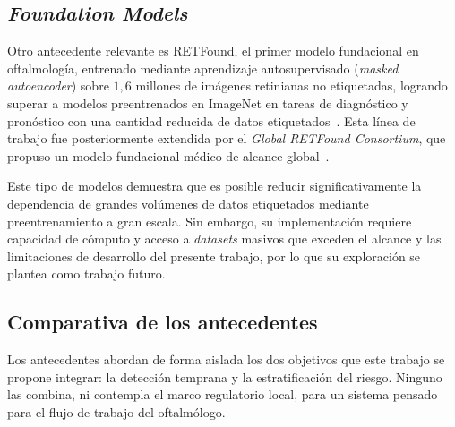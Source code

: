     \subsection*{\textit{Foundation Models}}

        Otro antecedente relevante es RETFound, el primer modelo fundacional en oftalmología, entrenado mediante aprendizaje autosupervisado (\textit{masked autoencoder}) sobre $1,6$ millones de imágenes retinianas no etiquetadas, logrando superar a modelos preentrenados en ImageNet en tareas de diagnóstico y pronóstico con una cantidad reducida de datos etiquetados~. Esta línea de trabajo fue posteriormente extendida por el \textit{Global RETFound Consortium}, que propuso un modelo fundacional médico de alcance global~.
        
        Este tipo de modelos demuestra que es posible reducir significativamente la dependencia de grandes volúmenes de datos etiquetados mediante preentrenamiento a gran escala. Sin embargo, su implementación requiere capacidad de cómputo y acceso a \textit{datasets} masivos que exceden el alcance y las limitaciones de desarrollo del presente trabajo, por lo que su exploración se plantea como trabajo futuro.

    \subsection*{Comparativa de los antecedentes}

        Los antecedentes abordan de forma aislada los dos objetivos que este trabajo se propone integrar: la detección temprana y la estratificación del riesgo. Ninguno las combina, ni contempla el marco regulatorio local, para un sistema pensado para el flujo de trabajo del oftalmólogo.

